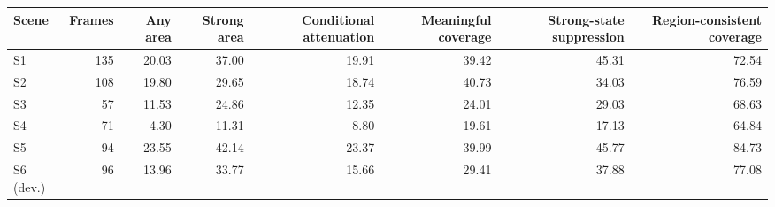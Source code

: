 \begin{tabular}{lrrrrrrr}
\toprule
Scene & Frames & Any area & Strong area & Conditional attenuation & Meaningful coverage & Strong-state suppression & Region-consistent coverage \\
\midrule
S1 & 135 & 20.03 & 37.00 & 19.91 & 39.42 & 45.31 & 72.54 \\
S2 & 108 & 19.80 & 29.65 & 18.74 & 40.73 & 34.03 & 76.59 \\
S3 & 57 & 11.53 & 24.86 & 12.35 & 24.01 & 29.03 & 68.63 \\
S4 & 71 & 4.30 & 11.31 & 8.80 & 19.61 & 17.13 & 64.84 \\
S5 & 94 & 23.55 & 42.14 & 23.37 & 39.99 & 45.77 & 84.73 \\
S6 (dev.) & 96 & 13.96 & 33.77 & 15.66 & 29.41 & 37.88 & 77.08 \\
\bottomrule
\end{tabular}
